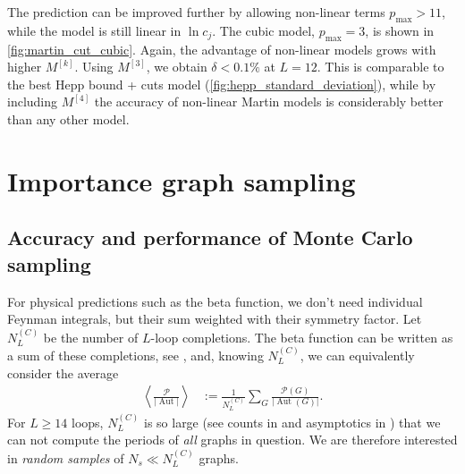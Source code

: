\documentclass[11pt]{scrartcl}
\numberwithin{equation}{section}
\newcommand{\abs}[1]{\lvert #1 \rvert}
\newcommand{\period}{\mathcal P}
\newcommand{\Aut}{\operatorname{Aut}}
\begin{document}
The prediction can be improved further by allowing non-linear terms  $p_\text{max}>11$, while the model is still linear in $\ln c_j $. The cubic model, $p_\text{max}=3$, is shown in \cref{fig:martin_cut_cubic}. Again, the advantage of non-linear models grows with higher $M^{[k]}$. Using $M^{[3]}$,   we obtain $\delta<0.1\%$ at $L=12$. This is comparable to the best Hepp bound + cuts model (\cref{fig:hepp_standard_deviation}), while by including $M^{[4]}$ the accuracy of non-linear Martin models is considerably better than any other model. 


























\FloatBarrier

\newpage


\section{Importance graph sampling}\label{sec:sampling}


\subsection{Accuracy and performance of Monte Carlo sampling}\label{sec:accuracy_performance}
For physical predictions such as the beta function, we don't need individual Feynman integrals, but their sum  weighted with their symmetry factor. 
Let $N_L^{(C)}$ be the number of $L$-loop completions. The beta function can be written as a sum of these completions, see \cite{panzer_hepp_2022}, and, knowing $N_L^{(C)}$, we can equivalently consider the average
\begin{align}\label{PAut_average}
	\left \langle\frac{ \period}{\abs{\Aut}} \right \rangle &:= \frac{1}{N_L^{(C)}} \sum_G\frac{ \period(G)}{\abs{\Aut(G)}}.
\end{align}
For $L \geq 14$ loops, $N_L^{(C)}$ is so large (see counts in \cite{balduf_statistics_2023} and asymptotics in \cite{borinsky_renormalized_2017}) that we can not compute the periods of \emph{all} graphs in question. We are therefore interested in \emph{random samples} of $N_s\ll N_L^{(C)}$ graphs. 
\end{document}
